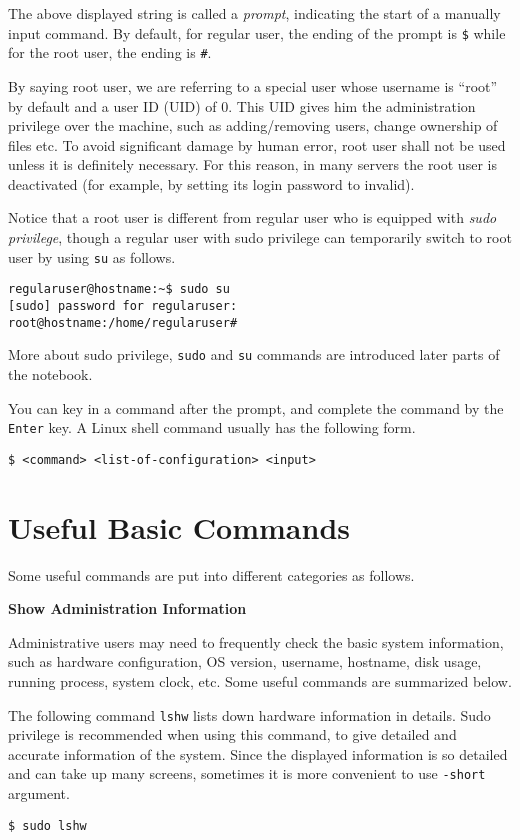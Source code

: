 The above displayed string is called a \textit{prompt}, indicating the start of a manually input command. By default, for regular user, the ending of the prompt is \verb|$| while for the root user, the ending is \verb|#|.

By saying root user, we are referring to a special user whose username is ``root'' by default and a user ID (UID) of $0$. This UID gives him the administration privilege over the machine, such as adding/removing users, change ownership of files etc. To avoid significant damage by human error, root user shall not be used unless it is definitely necessary. For this reason, in many servers the root user is deactivated (for example, by setting its login password to invalid).

Notice that a root user is different from regular user who is equipped with \textit{sudo privilege}, though a regular user with sudo privilege can temporarily switch to root user by using \verb|su| as follows.
\begin{verbatim}
regularuser@hostname:~$ sudo su
[sudo] password for regularuser:
root@hostname:/home/regularuser#
\end{verbatim}

More about sudo privilege, \verb|sudo| and \verb|su| commands are introduced later parts of the notebook.

You can key in a command after the prompt, and complete the command by the \verb|Enter| key. A Linux shell command usually has the following form.
\begin{verbatim}
$ <command> <list-of-configuration> <input>
\end{verbatim}


\section{Useful Basic Commands}

Some useful commands are put into different categories as follows.

\vspace{0.1in}
\noindent \textbf{Show Administration Information}
\vspace{0.1in}

Administrative users may need to frequently check the basic system information, such as hardware configuration, OS version, username, hostname, disk usage, running process, system clock, etc. Some useful commands are summarized below.

The following command \verb|lshw| lists down hardware information in details. Sudo privilege is recommended when using this command, to give detailed and accurate information of the system. Since the displayed information is so detailed and can take up many screens, sometimes it is more convenient to use \verb|-short| argument. 
\begin{verbatim}
$ sudo lshw
\end{verbatim}



